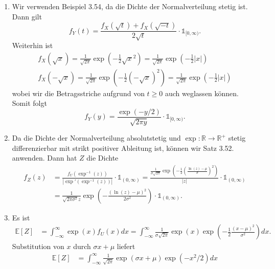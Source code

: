 \documentclass[a4paper]{article}
\begin{document}
\begin{enumerate}[label=(\alph*)]
	\item Wir verwenden Beispiel 3.54, da die Dichte der Normalverteilung stetig ist. Dann gilt
	      \begin{equation*}
		      f_{Y}(t) = \frac{f_X(\sqrt{t}) + f_X(\sqrt{-t})}{2 \sqrt{t}} \cdot \mathds{1}_{[0, \infty)}\text{.}
	      \end{equation*}
	      Weiterhin ist
	      \begin{align*}
		      f_X(\sqrt{x}) = \frac{1}{\sqrt{2 \pi}} \exp\left(- \frac{1}{2}\sqrt{x}^2\right) = \frac{1}{\sqrt{2 \pi}} \exp\left(- \frac{1}{2} |x|\right) \\
		      f_X(-\sqrt{x}) = \frac{1}{\sqrt{2 \pi}} \exp\left(- \frac{1}{2}(-\sqrt{x})^2\right) = \frac{1}{\sqrt{2 \pi}} \exp\left(- \frac{1}{2} |x|\right)
	      \end{align*}
	      wobei wir die Betragsstriche aufgrund von $t \geq 0$ auch weglassen können. Somit folgt
	      \begin{equation*}
		      f_{Y}(y) = \frac{\exp\left(- y / 2\right)}{\sqrt{2 \pi y}} \cdot \mathds{1}_{[0, \infty)}\text{.}
	      \end{equation*}
	\item Da die Dichte der Normalverteilung absolutstetig und $\exp: \mathds{R} \to \mathds{R}^+$ stetig differenzierbar mit strikt positiver Ableitung ist, können wir Satz 3.52. anwenden. Dann hat $Z$ die Dichte
	      \begin{align*}
		      f_Z(z) & = \frac{f_U(\exp^{-1}(z))}{|\exp'(\exp^{-1}(z))|} \cdot \mathds{1}_{(0, \infty)} = \frac{\frac{1}{\sigma \sqrt{2 \pi}} \exp\left(-\frac{1}{2} \left(\frac{\ln(z) - \mu}{\sigma}\right)^2\right)}{|z|} \cdot \mathds{1}_{(0, \infty)} \\
		             & = \frac{1}{ \sqrt{2 \pi \sigma^2} z} \exp\left( -\frac{(\ln(z) - \mu)^2}{2\sigma^2}\right)\cdot \mathds{1}_{(0, \infty)}\text{.}
	      \end{align*}
	\item Es ist
	      \begin{align*}
		      \mathds{E}[Z] & = \int_{-\infty}^{\infty} \exp(x) f_U(x) dx = \int_{-\infty}^{\infty} \frac{1}{\sigma \sqrt{2 \pi}} \exp(x) \exp\left(- \frac{1}{2} \frac{(x - \mu)^2}{\sigma^2}\right) dx\text{.}
	      \end{align*}
	      Substitution von $x$ durch $\sigma x + \mu$ liefert
	      \begin{align*}
		      \mathds{E}[Z] & = \int_{-\infty}^{\infty} \frac{1}{\sqrt{2 \pi}} \exp(\sigma x + \mu) \exp(-x^2/2) dx                                 \\

\end{align*}
\end{enumerate}
\end{document}
